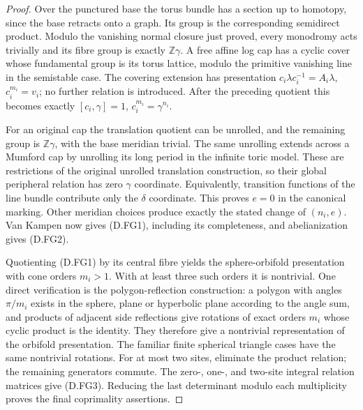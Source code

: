 \begin{proof}
Over the punctured base the torus bundle has a section up to homotopy,
since the base retracts onto a graph. Its group is the corresponding
semidirect product. Modulo the vanishing normal closure just proved,
every monodromy acts trivially and its fibre group is exactly
$\mathbb Z\gamma$. A free affine log cap has a cyclic cover whose
fundamental group is its torus lattice, modulo the primitive vanishing
line in the semistable case. The covering extension has presentation
$c_i\lambda c_i^{-1}=A_i\lambda$, $c_i^{m_i}=v_i$; no further relation
is introduced. After the preceding quotient this becomes exactly
$[c_i,\gamma]=1$, $c_i^{m_i}=\gamma^{n_i}$.

For an original cap the translation quotient can be unrolled, and the
remaining group is $\mathbb Z\gamma$, with the base meridian trivial.
The same unrolling extends across a Mumford cap by unrolling its long
period in the infinite toric model. These are restrictions of the
original unrolled translation construction, so their global peripheral
relation has zero $\gamma$ coordinate. Equivalently, transition
functions of the line bundle contribute only the $\delta$ coordinate.
This proves $e=0$ in the canonical marking. Other meridian choices
produce exactly the stated change of $(n_i,e)$. Van Kampen now gives
(D.FG1), including its completeness, and abelianization gives (D.FG2).

Quotienting (D.FG1) by its central fibre yields the sphere-orbifold
presentation with cone orders $m_i>1$. With at least three such orders
it is nontrivial. One direct verification is the polygon-reflection
construction: a polygon with angles $\pi/m_i$ exists in the sphere,
plane or hyperbolic plane according to the angle sum, and products of adjacent side reflections give rotations of exact
orders $m_i$ whose cyclic product is the identity. They therefore
give a nontrivial representation of the orbifold presentation. The familiar finite spherical triangle
cases have the same nontrivial rotations. For at most two sites,
eliminate the product relation; the remaining generators commute.
The zero-, one-, and two-site integral relation matrices give (D.FG3).
Reducing the last determinant modulo each multiplicity proves the
final coprimality assertions.
\end{proof}

